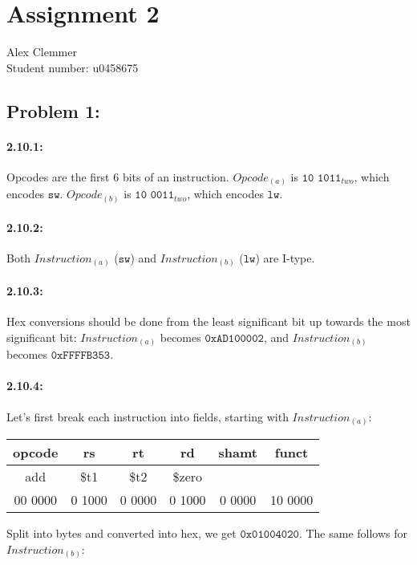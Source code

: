 \documentclass[a4paper]{article}
\begin{document}
\section*{Assignment 2 }
Alex Clemmer\\
Student number: u0458675

\subsection*{Problem 1:}
\paragraph*{2.10.1:} Opcodes are the first 6 bits of an instruction. $Opcode_{(a)}$ is $\texttt{10 1011}_{two}$, which encodes $\texttt{sw}$. $Opcode_{(b)}$ is $\texttt{10 0011}_{two}$, which encodes $\texttt{lw}$.

\paragraph*{2.10.2:} Both $Instruction_{(a)}$ ($\texttt{sw}$) and $Instruction_{(b)}$ ($\texttt{lw}$) are I-type.

\paragraph*{2.10.3:} Hex conversions should be done from the least significant bit up towards the most significant bit: $Instruction_{(a)}$ becomes $\texttt{0xAD100002}$, and $Instruction_{(b)}$ becomes $\texttt{0xFFFFB353}$.

\paragraph*{2.10.4:} Let's first break each instruction into fields, starting with $Instruction_{(a)}$:

\begin{center}
\begin{tabular}{|c|c|c|c|c|c|}
\hline
opcode & rs & rt & rd & shamt & funct \\
\hline
\hline
add & \$t1 & \$t2 & \$zero & \multicolumn{2}{|c|}{} \\
\hline
00 0000 & 0 1000 & 0 0000 & 0 1000 & 0 0000 & 10 0000 \\
\hline
\end{tabular}
\end{center}

Split into bytes and converted into hex, we get $\texttt{0x01004020}$. The same follows for $Instruction_{(b)}$:
\end{document}
